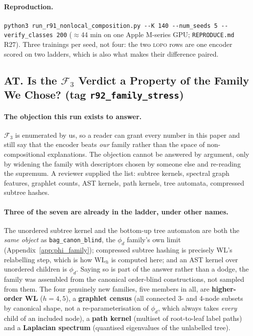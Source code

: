 \paragraph{Reproduction.} \texttt{python3 run\_r91\_nonlocal\_composition.py -{}-K 140 -{}-num\_seeds 5 -{}-verify\_classes 200} ($\approx$44 min on one Apple M-series GPU; \texttt{REPRODUCE.md} R27). Three trainings per seed, not four: the two \textsc{lopo} rows are one encoder scored on two ladders, which is also what makes their difference paired.


\subsection*{AT. Is the $\mathcal{F}_3$ Verdict a Property of the Family We Chose? (tag \texttt{r92\_family\_stress})}

\paragraph{The objection this run exists to answer.} $\mathcal{F}_3$ is enumerated by us, so a reader can grant every number in this paper and still say that the encoder beats \emph{our} family rather than the space of non-compositional explanations. The objection cannot be answered by argument, only by widening the family with descriptors chosen by someone else and re-reading the supremum. A reviewer supplied the list: subtree kernels, spectral graph features, graphlet counts, AST kernels, path kernels, tree automata, compressed subtree hashes.

\paragraph{Three of the seven are already in the ladder, under other names.} The unordered subtree kernel and the bottom-up tree automaton are both the \emph{same object} as \texttt{bag\_canon\_blind}, the $\phi_d$ family's own limit (Appendix~\ref{app:phi_family}); compressed subtree hashing is precisely WL's relabelling step, which is how $\mathrm{WL}_h$ is computed here; and an AST kernel over unordered children is $\phi_d$. Saying so is part of the answer rather than a dodge, the family was assembled from the canonical order-blind constructions, not sampled from them. The four genuinely new families, five members in all, are \textbf{higher-order WL} ($h{=}4,5$), a \textbf{graphlet census} (all connected 3- and 4-node subsets by canonical shape, not a re-parameterisation of $\phi_d$, which always takes \emph{every} child of an included node), a \textbf{path kernel} (multiset of root-to-leaf label paths) and a \textbf{Laplacian spectrum} (quantised eigenvalues of the unlabelled tree).

